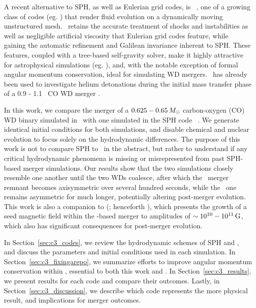 
A recent alternative to SPH, as well as Eulerian grid codes, is \arepo\ \citep{spri10}, one of a growing class of codes (eg. \citealt{duffm11, gabujl12, vandr16}) that render fluid evolution on a dynamically moving unstructured mesh.  \arepo\ retains the accurate treatment of shocks and instabilities as well as negligible artificial viscosity that Eulerian grid codes feature, while gaining the automatic refinement and Galilean invariance inherent to SPH.  These features, coupled with a tree-based self-gravity solver, make it highly attractive for astrophysical simulations (eg. \citealt{voge+12, pakms13, hayw+14, marips14, ohlm+16}), and, with the notable exception of formal angular momentum conservation, ideal for simulating WD mergers.  \arepo\ has already been used to investigate helium detonations during the initial mass transfer phase of a 0.9 - 1.1 \Msun\ CO WD merger \citep{pakm+13}.

In this work, we compare the merger of a $0.625 - 0.65\,\Msun$ carbon-oxygen (CO) WD binary simulated in \arepo\ with one simulated in the SPH code \gasoline\ \citep{wadssq04}.  We generate identical initial conditions for both simulations, and disable chemical and nuclear evolution to focus solely on the hydrodynamic differences.  The purpose of this work is not to compare SPH to \arepo\ in the abstract, but rather to understand if any critical hydrodynamic phenomena is missing or misrepresented from past SPH-based merger simulations.  Our results show that the two simulations closely resemble one another until the two WDs coalesce, after which the \gasoline\ merger remnant becomes axisymmetric over several hundred seconds, while the \arepo\ one remains asymmetric for much longer, potentially altering post-merger evolution.  This work is also a companion to \citeauthor{zhu+15} (\citeyear{zhu+15}; henceforth \citeal{zhu+15}), which presents the growth of a seed magnetic field within the \arepo-based merger to amplitudes of $\sim10^{10}-10^{11}\,\mathrm{G}$, which also has significant consequences for post-merger evolution.

In Section~\ref{sec:c3_codes}, we review the hydrodynamic schemes of SPH and \arepo, and discuss the parameters and initial conditions used in each simulation.  In Section~\ref{sec:c3_fixingarepo}, we summarize efforts to improve angular momentum conservation within \arepo, essential to both this work and \citeal{zhu+15}.  In Section~\ref{sec:c3_results}, we present results for each code and compare their outcomes.  Lastly, in Section~\ref{sec:c3_discussion}, we describe which code represents the more physical result, and implications for merger outcomes.
